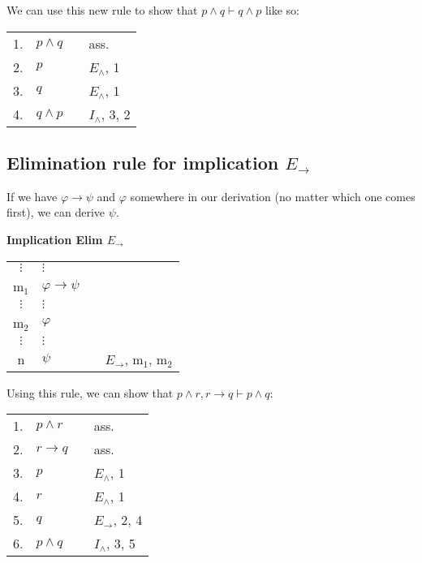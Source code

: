 \documentclass[nobib,nofonts]{tufte-handout}
\begin{document}
We can use this new rule to show that $p \wedge q \vdash q \wedge p$ like so:

\begin{tabular}{clcl}
  1. & $p \wedge q$ & & ass. \\
  2. & $p$          & & $E_{\wedge}$, 1 \\
  3. & $q$          & & $E_{\wedge}$, 1 \\
  4. & $q \wedge p$ & & $I_{\wedge}$, 3, 2
\end{tabular}


\subsection{Elimination rule for implication $E_{\rightarrow}$}

If we have $\varphi \rightarrow \psi$ and $\varphi$ somewhere in our derivation (no matter which one comes first), we can derive $\psi$.

\bigskip
\noindent \colorbox{mygray!60}{\centering
  \begin{minipage}[t]{0.35\linewidth}
    \textbf{Implication Elim $E_{\rightarrow}$}
  \end{minipage}
  \begin{minipage}[t]{0.55\linewidth}
    \begin{tabular}{clcl}
      $\vdots$ & $\vdots$                   & \\
      m$_{1}$  & $\varphi \rightarrow \psi$ &  \\
      $\vdots$ & $\vdots$                   & \\
      m$_{2}$  & $\varphi$                  &  \\
      $\vdots$ & $\vdots$                   & \\
      n        & $\psi$                     & & $E_{\rightarrow}$, m$_{1}$, m$_{2}$
    \end{tabular}
  \end{minipage}
}
\bigskip

Using this rule, we can show that $p \wedge r, r \rightarrow q \vdash p \wedge q$:

\begin{tabular}{clcl}
  1. & $p \wedge r$      & & ass. \\
  2. & $r \rightarrow q$ & & ass.  \\
  3. & $p$               & & $E_{\wedge}$, 1  \\
  4. & $r$               & & $E_{\wedge}$, 1  \\
  5. & $q$               & & $E_{\rightarrow}$, 2, 4 \\
  6. & $p \wedge q$      & & $I_{\wedge}$, 3, 5
\end{tabular}
\end{document}
